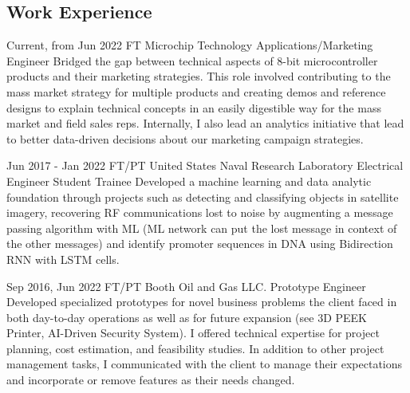 \documentclass[
	10pt, %
]{FreemanCV}
\begin{document}
\begin{paracol}{2}
\section{Work Experience}





\jobentry
	{Current, from Jun 2022} %
	{FT} %
	{Microchip Technology} %
	{Applications/Marketing Engineer} %
	{ %
		Bridged the gap between technical aspects of 8-bit microcontroller products and their marketing strategies.
		This role involved contributing to the mass market strategy for multiple products
		and creating demos and reference designs to explain technical concepts in an easily digestible way for the mass market and field sales reps. 
		Internally, I also lead an analytics initiative that lead to better data-driven decisions about our marketing campaign strategies.
	} 


\jobentry
	{Jun 2017 - Jan 2022} %
	{FT/PT} %
	{United States Naval Research Laboratory} %
	{Electrical Engineer Student Trainee} %
	{ %
		Developed a machine learning and data analytic foundation through projects such as
		detecting and classifying objects in satellite imagery,
		recovering RF communications lost to noise by augmenting a message passing algorithm with ML (ML network can put the lost message in context of the other messages)
		and identify promoter sequences in DNA using Bidirection RNN with LSTM cells.
	} 


\jobentry
	{Sep 2016, Jun 2022} %
	{FT/PT} %
	{Booth Oil and Gas LLC.} %
	{Prototype Engineer} %
	{ %
		Developed specialized prototypes for novel business problems the client faced in both day-to-day operations
		as well as for future expansion (see 3D PEEK Printer, AI-Driven Security System).
		I offered technical expertise for project planning, cost estimation, and feasibility studies.
		In addition to other project management tasks, I communicated with the client to manage their expectations
		and incorporate or remove features as their needs changed.
	}
	

\end{paracol}
\end{document}
